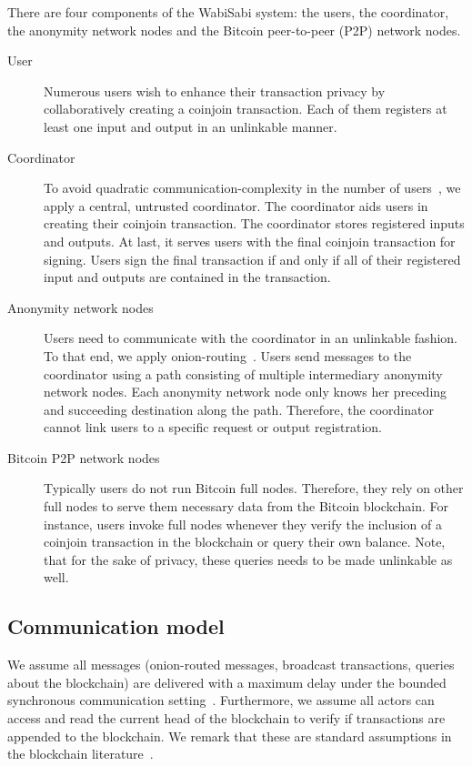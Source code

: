 \documentclass[a4paper]{article}
\begin{document}
There are four components of the WabiSabi system: the users, the coordinator, the anonymity network nodes and the Bitcoin peer-to-peer (P2P) network nodes.
\begin{description}
    \item[User] Numerous users wish to enhance their transaction privacy by collaboratively creating a coinjoin transaction. Each of them registers at least one input and output in an unlinkable manner.
    \item[Coordinator] To avoid quadratic communication-complexity in the number of users~\cite{ruffing2014coinshuffle}, we apply a central, untrusted coordinator. The coordinator aids users in creating their coinjoin transaction. The coordinator stores registered inputs and outputs. At last, it serves users with the final coinjoin transaction for signing. Users sign the final transaction if and only if all of their registered input and outputs are contained in the transaction.
    \item[Anonymity network nodes] Users need to communicate with the coordinator in an unlinkable fashion. To that end, we apply onion-routing~\cite{reed1998anonymous}. Users send messages to the coordinator using a path consisting of multiple intermediary anonymity network nodes. Each anonymity network node only knows her preceding and succeeding destination along the path. Therefore, the coordinator cannot link users to a specific request or output registration.
    \item[Bitcoin P2P network nodes] Typically users do not run Bitcoin full nodes. Therefore, they rely on other full nodes to serve them necessary data from the Bitcoin blockchain. For instance, users invoke full nodes whenever they verify the inclusion of a coinjoin transaction in the blockchain or query their own balance. Note, that for the sake of privacy, these queries needs to be made unlinkable as well.
\end{description}

\subsection{Communication model} \label{sec:commodel}
We assume all messages (onion-routed messages, broadcast transactions, queries about the blockchain) are delivered with a maximum delay under the bounded synchronous communication setting~\cite{attiya2004distributed}. Furthermore, we assume all actors
can access and read the current head of the blockchain
to verify if transactions are appended to the blockchain.
We remark that these are standard assumptions in the
blockchain literature~\cite{badertscher2017bitcoin}.
\end{document}
